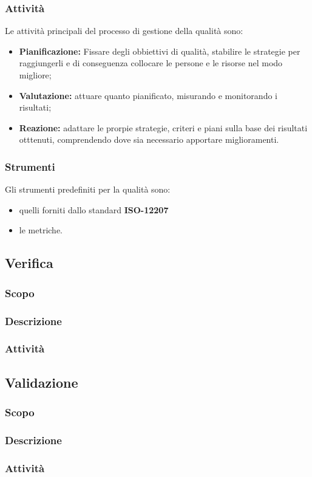         \subsubsection{Attività}
        Le attività principali del processo di gestione della qualità sono:
        \begin{itemize}
            \item \textbf{Pianificazione: } Fissare degli obbiettivi di qualità, stabilire le strategie per raggiungerli e di conseguenza collocare le persone e le risorse nel modo migliore;
            \item \textbf{Valutazione: }attuare quanto pianificato, misurando e monitorando i risultati;
            \item \textbf{Reazione:} adattare le prorpie strategie, criteri e piani sulla base dei risultati otttenuti, comprendendo dove sia necessario apportare miglioramenti.
        \end{itemize}
        \subsubsection{Strumenti}
        Gli strumenti predefiniti per la qualità sono:
        \begin{itemize}
            \item quelli forniti dallo standard \textbf{ISO-12207} %
            \item le metriche.
        \end{itemize}
    \subsection{Verifica}
        \subsubsection{Scopo}
        \subsubsection{Descrizione}
        \subsubsection{Attività}
    \subsection{Validazione}
        \subsubsection{Scopo}
        \subsubsection{Descrizione}
        \subsubsection{Attività}
